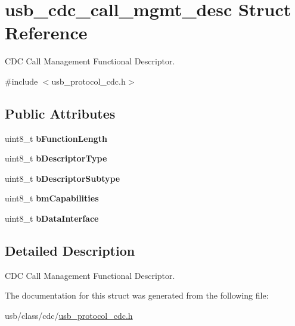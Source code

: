 \hypertarget{structusb__cdc__call__mgmt__desc}{}\section{usb\+\_\+cdc\+\_\+call\+\_\+mgmt\+\_\+desc Struct Reference}
\label{structusb__cdc__call__mgmt__desc}


C\+DC Call Management Functional Descriptor.  




{\ttfamily \#include $<$usb\+\_\+protocol\+\_\+cdc.\+h$>$}

\subsection*{Public Attributes}
\begin{DoxyCompactItemize}
\item 
\mbox{\label{structusb__cdc__call__mgmt__desc_a90dcd3c7f9512e1817d8fddcbc9b5a9d}} 
uint8\+\_\+t {\bfseries b\+Function\+Length}
\item 
\mbox{\label{structusb__cdc__call__mgmt__desc_acb83d0c1a242cac31346b572d0a0d5f3}} 
uint8\+\_\+t {\bfseries b\+Descriptor\+Type}
\item 
\mbox{\label{structusb__cdc__call__mgmt__desc_a9016d5a06d3f9ef19b357a5742b044bd}} 
uint8\+\_\+t {\bfseries b\+Descriptor\+Subtype}
\item 
\mbox{\label{structusb__cdc__call__mgmt__desc_a8307506ebd43577ede63f2cdb6a471cd}} 
uint8\+\_\+t {\bfseries bm\+Capabilities}
\item 
\mbox{\label{structusb__cdc__call__mgmt__desc_ab84bd02aeb894a991c154c99d56cf733}} 
uint8\+\_\+t {\bfseries b\+Data\+Interface}
\end{DoxyCompactItemize}


\subsection{Detailed Description}
C\+DC Call Management Functional Descriptor. 

The documentation for this struct was generated from the following file\+:\begin{DoxyCompactItemize}
\item 
usb/class/cdc/\hyperlink{usb__protocol__cdc_8h}{usb\+\_\+protocol\+\_\+cdc.\+h}\end{DoxyCompactItemize}
